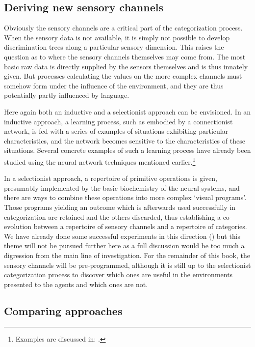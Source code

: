 \subsection{Deriving new sensory channels}

Obviously the sensory channels are a critical 
part of the categorization process. When the sensory data is 
not available, it is simply not possible to develop 
discrimination trees along a particular sensory dimension. 
This raises the question as to where the sensory channels
themselves may come from. 
The most basic raw data is directly supplied by
the sensors themselves and is thus innately given. But 
processes calculating the values on 
the more complex channels must somehow form under the 
influence of the environment, and they are
thus potentially partly influenced by language. 

Here again both an inductive and a selectionist approach
can be envisioned. In an inductive approach, a learning
process, such as embodied by a connectionist network, 
is fed with a series of examples of situations 
exhibiting particular characteristics, and the network 
becomes sensitive to the characteristics of these
situations. Several concrete examples of such a 
learning process have already been studied 
using the neural network techniques mentioned earlier.\footnote{
Examples are discussed in: \cite{Linsker:1990}.} 

In a selectionist approach, a repertoire of primitive operations
is given, presumably implemented by the 
basic biochemistry of the neural systems, and there are
ways to combine these operations into more complex
`visual programs'. Those
programs yielding an outcome which
is afterwards used successfully in categorization are 
retained and the others discarded, thus establishing 
a co-evolution between a repertoire of sensory channels
and a repertoire of 
categories. We have already done some successful experiments 
in this direction (\cite{Dejong:1999}) 
but this theme will not be pursued further here as a full discussion 
would be too much a digression from the main line
of investigation. For the remainder of this book,
the sensory channels will be pre-programmed, 
although it is still up to the selectionist 
categorization process to discover which ones are useful
in the environments presented to the agents and which 
ones are not. 

\subsection{Comparing approaches}

